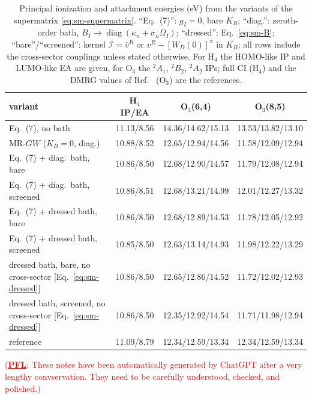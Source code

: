 \documentclass[aip,jcp,reprint,noshowkeys,superscriptaddress]{revtex4-1}
\newcommand{\titou}[1]{\textcolor{red}{#1}}
\newcommand{\PFL}[1]{\titou{(\underline{\bf PFL}: #1)}}
\begin{document}
\begin{table}[t]
\caption{Principal ionization and attachment energies (eV) from the
variants of the supermatrix \eqref{eq:sm-supermatrix}.  ``Eq.~(7)'':
$g_I=0$, bare $K_B$; ``diag.'': zeroth-order bath,
$B_I\to\operatorname{diag}(\kappa_n+\sigma_n\Omega_I)$; ``dressed'':
Eq.~\eqref{eq:sm-B}; ``bare''/``screened'': kernel $\mathcal I=\bar v^R$ or
$v^R-[W_D(0)]^{x}$ in $K_B$; all rows include the cross-sector couplings
unless stated otherwise.  For H$_4$ the HOMO-like IP and LUMO-like EA are given,
for O$_3$ the $^2A_1$, $^2B_2$, $^2A_2$ IPs; full CI (H$_4$) and the DMRG
values of Ref.~\cite{WangFangLi2026} (O$_3$) are the references.}
\label{tab:sm-results}
\begin{ruledtabular}
\begin{tabular}{lccc}
variant & H$_4$ IP/EA & O$_3$(6,4) & O$_3$(8,5) \\
\hline
Eq.~(7), no bath & 11.13/8.56 & 14.36/14.62/15.13 & 13.53/13.82/13.10 \\
MR-$GW$ ($K_B=0$, diag.) & 10.88/8.52 & 12.65/12.94/14.56 & 11.58/12.09/12.94 \\
Eq.~(7) + diag.\ bath, bare & 10.86/8.50 & 12.68/12.90/14.57 & 11.79/12.08/12.94 \\
Eq.~(7) + diag.\ bath, screened & 10.86/8.51 & 12.68/13.21/14.99 & 12.01/12.27/13.32 \\
Eq.~(7) + dressed bath, bare & 10.86/8.50 & 12.68/12.89/14.53 & 11.78/12.05/12.92 \\
Eq.~(7) + dressed bath, screened & 10.85/8.50 & 12.63/13.14/14.93 & 11.98/12.22/13.29 \\
dressed bath, bare, no cross-sector [Eq.~\eqref{eq:sm-dressed}] & 10.86/8.50 & 12.65/12.86/14.52 & 11.72/12.02/12.93 \\
dressed bath, screened, no cross-sector [Eq.~\eqref{eq:sm-dressed}] & 10.86/8.50 & 12.35/12.92/14.54 & 11.71/11.98/12.94 \\
reference & 11.09/8.79 & 12.34/12.59/13.34 & 12.34/12.59/13.34 \\
\end{tabular}
\end{ruledtabular}
\end{table}

\clearpage
\newpage


\PFL{These notes have been automatically generated by ChatGPT after a very lengthy convservation.
They need to be carefully understood, checked, and polished.}
\end{document}
